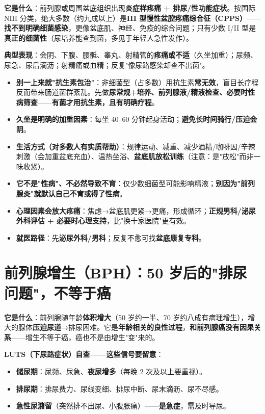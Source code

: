 \documentclass[12pt,UTF8,openany]{ctexbook}
\begin{document}
\textbf{它是什么}：前列腺或周围盆底组织出现\textbf{炎症样疼痛 + 排尿/性功能症状}。按国际 NIH 分类，绝大多数（约九成以上）是\textbf{III 型慢性盆腔疼痛综合征（CPPS）}——\textbf{找不到明确细菌感染}，更像盆底肌、神经、免疫的综合问题；只有少数 I/II 型是\textbf{真正的细菌性}（尿培养能查到菌，多见于年轻人急性发作）。

\textbf{典型表现}：会阴、下腹、腰骶、睾丸、射精管的\textbf{疼痛或不适}（久坐加重）；尿频、尿急、尿后滴沥；射精痛或血精；反复"像尿路感染却查不出菌"。

\begin{itemize}[leftmargin=2em,itemsep=0.3em]
  \item \textbf{别一上来就"抗生素包治"}：非细菌型（占多数）用抗生素\textbf{常无效}，盲目长疗程反而带来肠道菌群紊乱。先做\textbf{尿常规+培养、前列腺液/精液检查、必要时性病筛查}——\textbf{有菌才用抗生素，且有明确疗程}。
  \item \textbf{久坐是明确的加重因素}：每坐 40--60 分钟起身活动；\textbf{避免长时间骑行/压迫会阴}。
  \item \textbf{生活方式（对多数人有实质帮助）}：规律运动、减重、减少酒精/咖啡因/辛辣刺激（会加重盆底充血）、温热坐浴、\textbf{盆底肌放松训练}（注意：是"放松"而非一味收紧）。
  \item \textbf{它不是"性病"、不必然导致不育}：仅少数细菌型可能影响精液；\textbf{别因为"前列腺炎"就默认自己不育或得了性病}。
  \item \textbf{心理因素会放大疼痛}：焦虑→盆底肌更紧→更痛，形成循环；\textbf{正规男科/泌尿外科评估 + 必要时心理支持}，比"换十家医院"更有效。
  \item \textbf{就医路径}：先\textbf{泌尿外科/男科}；反复不愈可找\textbf{盆底康复专科}。
\end{itemize}

\section{前列腺增生（BPH）：50 岁后的"排尿问题"，不等于癌}

\textbf{它是什么}：前列腺随年龄\textbf{体积增大}（50 岁约一半、70 岁约八成有病理增生），增大的腺体\textbf{压迫尿道}→排尿困难。它是\textbf{年龄相关的良性过程}，\textbf{和前列腺癌没有因果关系}——增生不等于癌，癌也不是由增生"变"来的。

\textbf{LUTS（下尿路症状）自查——这些信号要留意}：
\begin{itemize}[leftmargin=2em,itemsep=0.3em]
  \item \textbf{储尿期}：尿频、尿急、\textbf{夜尿增多}（每晚 2 次及以上要重视）。
  \item \textbf{排尿期}：排尿费力、尿线变细、排尿中断、尿末滴沥、尿不尽感。
  \item \textbf{急性尿潴留}（突然排不出尿、小腹胀痛）——\textbf{是急症}，需及时导尿。
\end{itemize}
\end{document}
